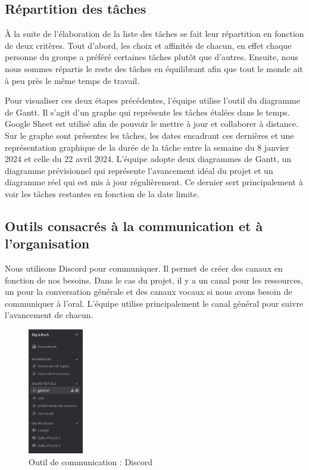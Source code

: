 \documentclass[a4paper,12pt]{article}
\begin{document}
\subsection{Répartition des tâches}
À la suite de l’élaboration de la liste des tâches se fait leur répartition en fonction de deux critères. 
Tout d’abord, les choix et affinités de chacun, en effet chaque personne du groupe a préféré certaines tâches plutôt que d’autres. 
Ensuite, nous nous sommes répartis le reste des tâches en équilibrant afin que tout le monde ait à peu près le même temps de travail.

Pour visualiser ces deux étapes précédentes, l’équipe utilise l'outil du diagramme de Gantt. 
Il s’agit d’un graphe qui représente les tâches étalées dans le temps. 
Google Sheet est utilisé afin de pouvoir le mettre à jour et collaborer à distance.
Sur le graphe sont présentes les tâches, les dates encadrant ces dernières et une représentation graphique de la durée de la tâche entre la semaine du 8 janvier 2024 et celle du 22 avril 2024.
L’équipe adopte deux diagrammes de Gantt, un diagramme prévisionnel qui représente l’avancement idéal du projet et un diagramme réel qui est mis à jour régulièrement. 
Ce dernier sert principalement à voir les tâches restantes en fonction de la date limite.

\subsection{Outils consacrés à la communication et à l'organisation}
Nous utilisons Discord pour communiquer. 
Il permet de créer des canaux en fonction de nos besoins. 
Dans le cas du projet, il y a un canal pour les ressources, un pour la conversation générale et des canaux vocaux si nous avons besoin de communiquer à l'oral.
L'équipe utilise principalement le canal général pour suivre l’avancement de chacun.

\begin{figure}[h]
	\centering
	\includegraphics[height=5.5cm]{img/discord.png}
	\caption{Outil de communication : Discord}
	\label{discord}
\end{figure}
\end{document}
